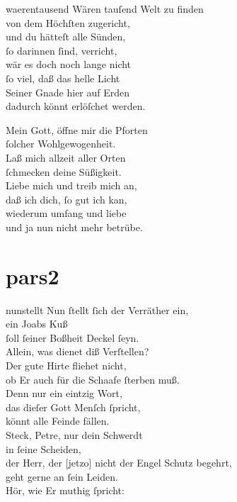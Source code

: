 \documentclass[tocstyle=ref-genre]{ees}
\begin{document}
{\begin{movement}{waerentausend}
  \voice[Coro]
  Wären tauſend Welt zu finden\\
  von dem Höchſten zugericht,\\
  und du hätteſt alle Sünden,\\
  ſo darinnen ſind, verricht,\\
  wär es doch noch lange nicht\\
  ſo viel, daß das helle Licht\\
  Seiner Gnade hier auf Erden\\
  dadurch könnt erlöſchet werden.

  Mein Gott, öffne mir die Pforten\\
  ſolcher Wohlgewogenheit.\\
  Laß mich allzeit aller Orten\\
  ſchmecken deine Süßigkeit.\\
  Liebe mich und treib mich an,\\
  daß ich dich, ſo gut ich kan,\\
  wiederum umfang und liebe\\
  und ja nun nicht mehr betrübe.
\end{movement}

\part{pars2}

\begin{movement}{nunstellt}
  Nun ſtellt ſich der Verräther ein,\\
  ein Joabs Kuß\\
  ſoll ſeiner Boßheit Deckel ſeyn.\\
  Allein, was dienet diß Verſtellen?\\
  Der gute Hirte fliehet nicht,\\
  ob Er auch für die Schaafe ſterben muß.\\
  Denn nur ein eintzig Wort,\\
  das dieſer Gott Menſch ſpricht,\\
  könnt alle Feinde fällen.\\
  Steck, Petre, nur dein Schwerdt\\
  in ſeine Scheiden,\\
  der Herr, der [jetzo] nicht der Engel Schutz begehrt,\\
  geht gerne an ſein Leiden.\\
  Hör, wie Er muthig ſpricht:
\end{movement}

}
\end{document}
